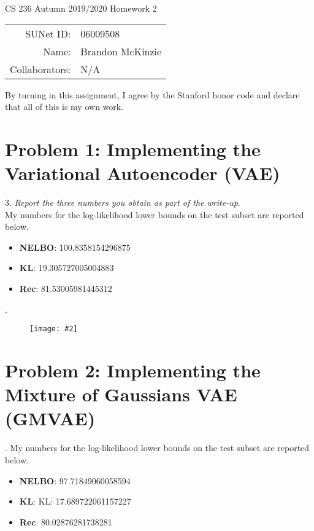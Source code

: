 \documentclass[11pt]{article}
\newcommand\p{\noindent}
\newcommand\myfig[2][0.3\textwidth]{\begin{figure}[h!]\centering\texttt{[image: \#2]}\end{figure}}
\begin{document}
\begin{center}
	{\Large CS 236 Autumn 2019/2020 Homework 2}
	
	\begin{tabular}{rl}
		SUNet ID: & 06009508 \\
		Name: & Brandon McKinzie \\
		Collaborators: & N/A
	\end{tabular}
\end{center}

\p By turning in this assignment, I agree by the Stanford honor code and declare
that all of this is my own work.

\section*{Problem 1: Implementing the Variational Autoencoder (VAE)}

3. \textit{Report the three numbers you obtain as part of the write-up}. \\

\p My numbers for the log-likelihood lower bounds on the test subset are reported below. 

\begin{itemize}
	\item \textbf{NELBO}: 100.8358154296875
	
	\item \textbf{KL}: 19.305727005004883
	
	\item \textbf{Rec}: 81.53005981445312
\end{itemize}

\p 4.  

\myfig[\textwidth]{hw2_1_3.png}





\clearpage
\section*{Problem 2: Implementing the Mixture of Gaussians VAE (GMVAE)}


\p 2. My numbers for the log-likelihood lower bounds on the test subset are reported below. 

\begin{itemize}
	\item \textbf{NELBO}: 97.71849060058594
	
	\item \textbf{KL}: KL: 17.689722061157227
	
	\item \textbf{Rec}: 80.02876281738281
\end{itemize}
\end{document}

